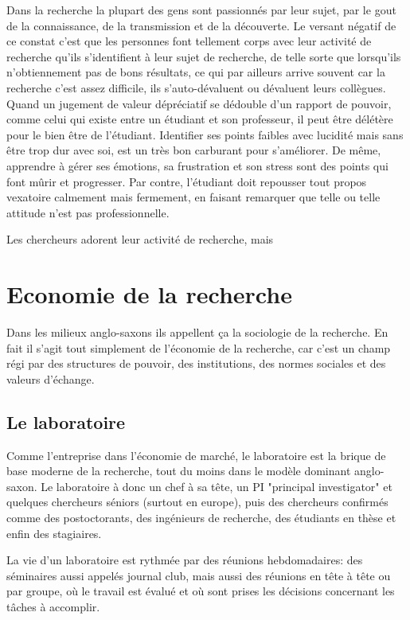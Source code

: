 \documentclass[24pt]{article}
\begin{document}
Dans la recherche la plupart des gens sont passionnés par leur sujet, par le gout de la connaissance, de la transmission et de la découverte. Le versant négatif de ce constat c'est que les personnes font tellement corps avec leur activité de  recherche qu'ils s'identifient à leur sujet de recherche, de telle sorte que lorsqu'ils n'obtiennement pas de bons résultats, ce qui par ailleurs arrive souvent car la recherche c'est assez difficile, ils s'auto-dévaluent ou dévaluent leurs collègues.  Quand un jugement de valeur dépréciatif se dédouble d'un rapport de pouvoir, comme celui qui existe  entre un étudiant et son professeur, il peut être délétère pour le bien être de l'étudiant. 
Identifier ses points faibles avec lucidité mais sans être trop dur avec soi, est un très bon carburant pour s'améliorer. De même, apprendre à gérer ses émotions, sa frustration et son stress sont des points qui font mûrir et progresser. Par contre, l'étudiant doit repousser tout propos vexatoire calmement mais fermement,  en faisant remarquer que telle ou telle attitude n'est pas professionnelle.

Les chercheurs adorent leur activité de recherche, mais 


\section{Economie de la recherche}
 
Dans les milieux anglo-saxons ils appellent ça la sociologie de la recherche. En fait il s'agit tout simplement de l'économie de la recherche, car c'est un champ régi par des structures de pouvoir, des institutions, des normes sociales et des valeurs d'échange. 

\subsection{Le laboratoire}
Comme l'entreprise dans l'économie de marché, le laboratoire est la brique de base moderne de la recherche, tout du moins dans le modèle dominant anglo-saxon. Le laboratoire à donc un chef à sa tête, un PI "principal investigator" et quelques chercheurs séniors (surtout en europe), puis des chercheurs confirmés comme des postoctorants, des ingénieurs de recherche, des étudiants en thèse et enfin des stagiaires. 

La vie d'un laboratoire est rythmée par des réunions hebdomadaires: des séminaires aussi appelés journal club, mais aussi des réunions en tête à tête ou par groupe, où le travail est évalué et où sont prises les décisions concernant les tâches à accomplir.
\end{document}
